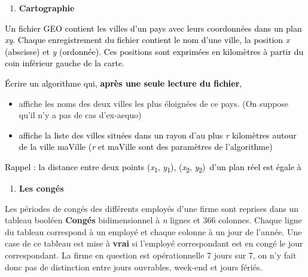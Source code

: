\liststyleExercice
\begin{enumerate}
\item {\sffamily\bfseries
Cartographie}
\end{enumerate}

\bigskip

{
\textcolor{black}{Un fichier GEO contient les villes d’un pays avec
leurs coordonnées dans un plan
}\textit{\textcolor{black}{xy}}\textcolor{black}{. Chaque
enregistrement du fichier contient le nom d’une ville, la position
}\textit{\textcolor{black}{x}}\textcolor{black}{ (abscisse) et
}\textit{\textcolor{black}{y}}\textcolor{black}{ (ordonnée). Ces
positions sont exprimées en kilomètres à partir du coin inférieur
gauche de la carte.}}


\bigskip

{
\textcolor{black}{Écrire un algorithme qui,
}\textbf{\textcolor{black}{après une seule lecture du
fichier}}\textcolor{black}{, }}

\liststyleListi
\begin{itemize}
\item {\color{black}
affiche les noms des deux villes les plus éloignées de ce pays. (On
suppose qu’il n’y a pas de cas d’ex-aequo)}
\item {
\textcolor{black}{affiche la liste des villes situées dans un rayon d’au
plus }\textit{\textcolor{black}{r}}\textcolor{black}{ kilomètres autour
de la }\textcolor{black}{ville maVille
(}\textit{\textcolor{black}{r}}\textcolor{black}{ et maVille sont des
paramètres de l’algorithme)}}
\end{itemize}
{
\textcolor{black}{Rappel}\textcolor{black}{ : la distance entre deux
points
(}\textit{\textcolor{black}{x}}\textcolor{black}{\textsubscript{1}}\textcolor{black}{,
}\textit{\textcolor{black}{y}}\textcolor{black}{\textsubscript{1}}\textcolor{black}{),
(}\textit{\textcolor{black}{x}}\textcolor{black}{\textsubscript{2}}\textcolor{black}{,
}\textit{\textcolor{black}{y}}\textcolor{black}{\textsubscript{2}}\textcolor{black}{)~d’un
plan réel est égale à}}

{%
 \par}

\liststyleExercice
\begin{enumerate}
\item {\sffamily\bfseries
Les congés}
\end{enumerate}
{
Les périodes de congés des différents employés d’une firme sont reprises
dans un tableau booléen \textbf{Congés} bidimensionnel à \textit{n}
lignes et 366 colonnes. Chaque ligne du tableau correspond à un employé
et chaque colonne à un jour de l’année. Une case de ce tableau est mise
à \textbf{vrai} si l’employé correspondant est en congé le jour
correspondant. La firme en question est opérationnelle 7 jours sur 7,
on n’y fait donc pas de distinction entre jours ouvrables, week-end et
jours fériés.}

